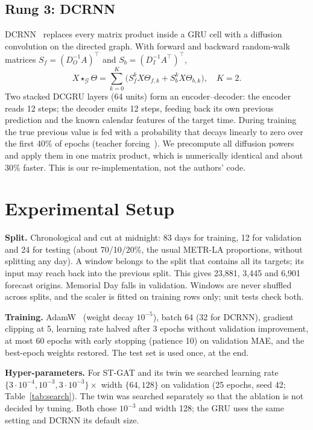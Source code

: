 \documentclass[conference]{IEEEtran}
\begin{document}
\subsection{Rung 3: DCRNN}
DCRNN~\cite{li2018dcrnn} replaces every matrix product inside a GRU cell with a diffusion convolution on the directed graph. With forward and backward random-walk matrices $S_f=(D_O^{-1}A)^\top$ and $S_b=(D_I^{-1}A^\top)^\top$,
\begin{equation}
X\star_{\mathcal{G}}\Theta=\sum_{k=0}^{K}\big(S_f^{k}X\Theta_{f,k}+S_b^{k}X\Theta_{b,k}\big),\quad K=2.
\end{equation}
Two stacked DCGRU layers (64 units) form an encoder--decoder: the encoder reads 12 steps; the decoder emits 12 steps, feeding back its own previous prediction and the known calendar features of the target time. During training the true previous value is fed with a probability that decays linearly to zero over the first 40\% of epochs (teacher forcing~\cite{bengio2015scheduled}). We precompute all diffusion powers and apply them in one matrix product, which is numerically identical and about 30\% faster. This is our re-implementation, not the authors' code.

\section{Experimental Setup}
\textbf{Split.} Chronological and cut at midnight: 83 days for training, 12 for validation and 24 for testing (about 70/10/20\%, the usual METR-LA proportions, without splitting any day). A window belongs to the split that contains all its targets; its input may reach back into the previous split. This gives 23{,}881, 3{,}445 and 6{,}901 forecast origins. Memorial Day falls in validation. Windows are never shuffled across splits, and the scaler is fitted on training rows only; unit tests check both.

\textbf{Training.} AdamW~\cite{loshchilov2019adamw} (weight decay $10^{-5}$), batch 64 (32 for DCRNN), gradient clipping at 5, learning rate halved after 3 epochs without validation improvement, at most 60 epochs with early stopping (patience 10) on validation MAE, and the best-epoch weights restored. The test set is used once, at the end.

\textbf{Hyper-parameters.} For ST-GAT and its twin we searched learning rate $\{3\cdot10^{-4},10^{-3},3\cdot10^{-3}\}\times$ width $\{64,128\}$ on validation (25 epochs, seed 42; Table~\ref{tab:search}). The twin was searched separately so that the ablation is not decided by tuning. Both chose $10^{-3}$ and width 128; the GRU uses the same setting and DCRNN its default size.
\end{document}
